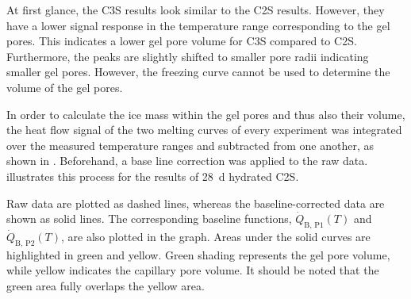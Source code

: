 At first glance, the \ac{C3S} results look similar to the \ac{C2S} results.
However, they have a lower signal response in the temperature range corresponding to the gel pores.
This indicates a lower gel pore volume for \ac{C3S} compared to \ac{C2S}.
Furthermore, the peaks are slightly shifted to smaller pore radii indicating smaller gel pores.
However, the freezing curve cannot be used to determine the volume of the gel pores.

In order to calculate the ice mass within the gel pores and thus also their volume, the heat flow signal of the two melting curves of every experiment was integrated over the measured temperature ranges and subtracted from one another, as shown in .
Beforehand, a base line correction was applied to the raw data.
 illustrates this process for the results of \qty{28}{\day} hydrated \ac{C2S}.

Raw data are plotted as dashed lines, whereas the baseline-corrected data are shown as solid lines.
The corresponding baseline functions, $\dot{Q}_\text{B, P1}(T)$ and $\dot{Q}_\text{B, P2}(T)$, are also plotted in the graph.
Areas under the solid curves are highlighted in green and yellow.
Green shading represents the gel pore volume, while yellow indicates the capillary pore volume.
It should be noted that the green area fully overlaps the yellow area.

